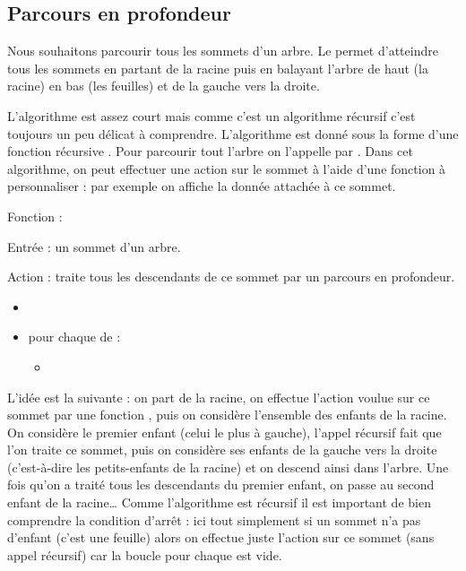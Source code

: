 \documentclass[11pt,class=report,crop=false]{standalone}
\begin{document}
\subsection{Parcours en profondeur}


Nous souhaitons parcourir tous les sommets d'un arbre. Le  permet d'atteindre tous les sommets en partant de la racine puis en balayant l'arbre de haut (la racine) en bas (les feuilles) et de la gauche vers la droite.


L'algorithme est assez court mais comme c'est un algorithme récursif c'est toujours un peu délicat à comprendre.
L'algorithme est donné sous la forme d'une fonction récursive . Pour parcourir tout l'arbre on l'appelle par 
. Dans cet algorithme, on peut effectuer une action sur le sommet à l'aide d'une fonction  à personnaliser : par exemple on affiche la donnée attachée à ce sommet.


\begin{algorithme}
	Fonction : 	
	
	Entrée : un sommet d'un arbre.
	
	Action : traite tous les descendants de ce sommet par un parcours en profondeur.
	
	\begin{itemize}
		\item {}
        \item pour chaque  de :
        \begin{itemize}			
	       \item {}
        \end{itemize}		
	\end{itemize}  
\end{algorithme}

L'idée est la suivante : on part de la racine, on effectue l'action voulue sur ce sommet par une fonction , puis on considère l'ensemble des enfants de la racine. On considère le premier enfant (celui le plus à gauche), l'appel récursif fait que l'on traite ce sommet, puis on considère ses enfants de la gauche vers la droite (c'est-à-dire les petits-enfants de la racine) et on descend ainsi dans l'arbre. Une fois qu'on a traité tous les descendants du premier enfant, on passe au second enfant de la racine\ldots{}
Comme l'algorithme est récursif il est important de bien comprendre la condition d'arrêt : ici tout simplement si un sommet n'a pas d'enfant (c'est une feuille) alors on effectue juste l'action sur ce sommet (sans appel récursif) car la boucle \og{}pour chaque \fg{} est vide.
\end{document}
